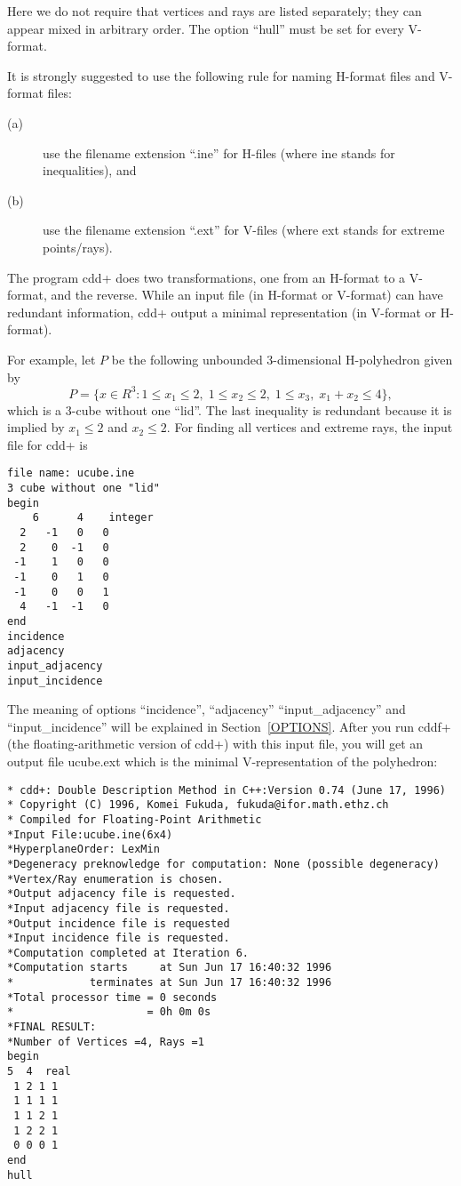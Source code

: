 \documentclass[11pt]{article}
\begin{document}
\bigskip
\noindent
Here we do not require that
vertices and rays are listed
separately; they can appear mixed in arbitrary
order.   The option ``hull'' must be set for every V-format.


It is strongly suggested to use the following rule for naming
H-format files and V-format files:   
\begin{description}
\item[(a)] use the filename  extension ``.ine'' for H-files (where ine stands for inequalities), and 
\item[(b)]  use the filename  extension ``.ext'' for V-files (where ext stands for extreme points/rays). 
\end{description}

The program cdd+ does two transformations, one from an H-format
to a V-format, and the reverse.    While an input file (in H-format or V-format)
can have redundant information, cdd+ output a minimal representation
(in V-format or H-format).

For example, let $P$ be the following unbounded 3-dimensional 
H-polyhedron given by
\[
   P = \{ x  \in R^3:
    1\le x_1 \le 2, \; 1 \le x_2 \le 2, \; 1 \le x_3,  \; x_1 + x_2 \le 4 \},
\]
which is a 3-cube without one ``lid''.   The last inequality is redundant
because it is implied by $x_1 \le 2$ and $x_2 \le 2$.
For finding all
vertices and extreme rays, the input file for cdd+ is

\begin{verbatim}
file name: ucube.ine
3 cube without one "lid"
begin
    6      4    integer
  2   -1   0   0
  2    0  -1   0
 -1    1   0   0
 -1    0   1   0
 -1    0   0   1
  4   -1  -1   0
end
incidence
adjacency
input_adjacency
input_incidence
\end{verbatim}

The meaning of options ``incidence'', ``adjacency''
``input\_adjacency'' and ``input\_incidence'' 
will be explained in Section~\ref{OPTIONS}.
After you run cddf+ (the floating-arithmetic version of cdd+) 
with this input file, you will get
an output file ucube.ext  which is the minimal V-representation
of the polyhedron:

\begin{verbatim}
* cdd+: Double Description Method in C++:Version 0.74 (June 17, 1996)
* Copyright (C) 1996, Komei Fukuda, fukuda@ifor.math.ethz.ch
* Compiled for Floating-Point Arithmetic
*Input File:ucube.ine(6x4)
*HyperplaneOrder: LexMin
*Degeneracy preknowledge for computation: None (possible degeneracy)
*Vertex/Ray enumeration is chosen.
*Output adjacency file is requested.
*Input adjacency file is requested.
*Output incidence file is requested
*Input incidence file is requested.
*Computation completed at Iteration 6.
*Computation starts     at Sun Jun 17 16:40:32 1996
*            terminates at Sun Jun 17 16:40:32 1996
*Total processor time = 0 seconds
*                     = 0h 0m 0s
*FINAL RESULT:
*Number of Vertices =4, Rays =1
begin
5  4  real
 1 2 1 1
 1 1 1 1
 1 1 2 1
 1 2 2 1
 0 0 0 1
end
hull
\end{verbatim}
\end{document}
